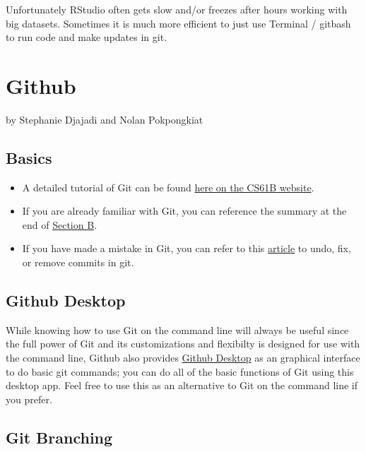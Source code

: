 \documentclass[]{book}
\providecommand{\tightlist}{%
  \setlength{\itemsep}{0pt}\setlength{\parskip}{0pt}}
\begin{document}
Unfortunately RStudio often gets slow and/or freezes after hours working
with big datasets. Sometimes it is much more efficient to just use
Terminal / gitbash to run code and make updates in git.

\hypertarget{Github}{\chapter{Github}\label{Github}}

by Stephanie Djajadi and Nolan Pokpongkiat

\section{Basics}\label{basics}

\begin{itemize}
\tightlist
\item
  A detailed tutorial of Git can be found
  \href{https://sp19.datastructur.es/materials/guides/using-git\#b-local-repositories-narrative-introduction}{here
  on the CS61B website}.
\item
  If you are already familiar with Git, you can reference the summary at
  the end of
  \href{https://sp19.datastructur.es/materials/guides/using-git\#b-local-repositories-narrative-introduction}{Section
  B}.
\item
  If you have made a mistake in Git, you can refer to this
  \href{https://sethrobertson.github.io/GitFixUm/fixup.html}{article} to
  undo, fix, or remove commits in git.
\end{itemize}

\section{Github Desktop}\label{github-desktop}

While knowing how to use Git on the command line will always be useful
since the full power of Git and its customizations and flexibilty is
designed for use with the command line, Github also provides
\href{https://desktop.github.com/}{Github Desktop} as an graphical
interface to do basic git commands; you can do all of the basic
functions of Git using this desktop app. Feel free to use this as an
alternative to Git on the command line if you prefer.

\section{Git Branching}\label{git-branching}
\end{document}
